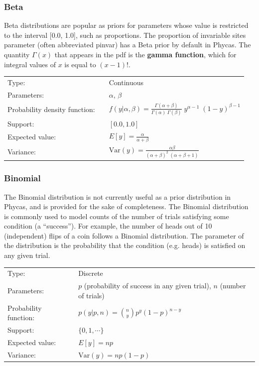 \documentclass[10pt]{article}
\newcommand{\term}[1]{{\bfseries #1}\index{#1}}	%
\newcommand{\Var}{\mbox{Var}}
\begin{document}
\subsubsection{Beta}\label{betadist}

Beta distributions are popular as priors for parameters whose value is restricted to the interval [0.0, 1.0], such as proportions. The proportion of invariable sites parameter (often abbreviated pinvar) has a Beta prior by default in Phycas. The quantity $\Gamma(x)$ that appears in the pdf is the \term{gamma function}, which for integral values of $x$ is equal to $(x-1)!$.

\begin{tabular}{lcl}
Type:                 & & Continuous \\
Parameters:           & & $\alpha$, $\beta$   \\
Probability density function: & & $f(y|\alpha, \beta) = \frac{\Gamma(\alpha + \beta)}{\Gamma(\alpha) \; \Gamma(\beta)} \; y^{\alpha-1} \; (1-y)^{\beta - 1}$ \\
Support:              & & $[0.0,1.0]$     \\
Expected value:       & & $E[y] = \frac{\alpha}{\alpha + \beta}$ \\
Variance:             & & $\Var(y) = \frac{\alpha \beta}{(\alpha + \beta)^2 \; (\alpha + \beta + 1)}$ 
\end{tabular}

\subsubsection{Binomial}\label{binomialdist}

The Binomial distribution is not currently useful as a prior distribution in Phycas, and is provided for the sake of completeness. The Binomial distribution is commonly used to model counts of the number of trials satisfying some condition (a ``success''). For example, the number of heads out of 10 (independent) flips of a coin follows a Binomial distribution. The parameter of the distribution is the probability that the condition (e.g. heads) is satisfied on any given trial.

\begin{tabular}{lcl}
Type:                 & & Discrete \\
Parameters:           & & $p$ (probability of success in any given trial), $n$ (number of trials)    \\
Probability function: & & $p(y|p,n) = {n \choose y} p^y (1-p)^{n-y} $ \\
Support:              & & $\{0,1,\cdots\}$     \\
Expected value:       & & $E[y] = n p$ \\
Variance:             & & $\Var(y) = n p(1-p)$ 
\end{tabular}
\end{document}
